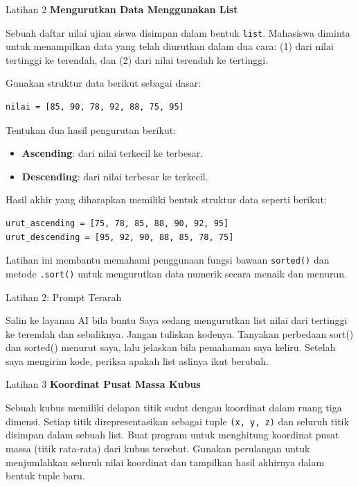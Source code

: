 \documentclass[aspectratio=169, table]{beamer}
\begin{document}
\begin{frame}[fragile,allowframebreaks=0.8]{Latihan 2}
\footnotesize
\textbf{Mengurutkan Data Menggunakan List}\par\medskip
Sebuah daftar nilai ujian siswa disimpan dalam bentuk \texttt{list}. 
Mahasiswa diminta untuk menampilkan data yang telah diurutkan dalam dua cara:  
(1) dari nilai tertinggi ke terendah, dan  
(2) dari nilai terendah ke tertinggi.

Gunakan struktur data berikut sebagai dasar:

\begin{lstlisting}[style=PythonStyle, breaklines=true]
nilai = [85, 90, 78, 92, 88, 75, 95]
\end{lstlisting}

Tentukan dua hasil pengurutan berikut:
\begin{itemize}
  \item \textbf{Ascending}: dari nilai terkecil ke terbesar.
  \item \textbf{Descending}: dari nilai terbesar ke terkecil.
\end{itemize}

Hasil akhir yang diharapkan memiliki bentuk struktur data seperti berikut:

\begin{lstlisting}[style=PythonStyle, breaklines=true]
urut_ascending = [75, 78, 85, 88, 90, 92, 95]
urut_descending = [95, 92, 90, 88, 85, 78, 75]
\end{lstlisting}

Latihan ini membantu memahami penggunaan fungsi bawaan \texttt{sorted()} 
dan metode \texttt{.sort()} untuk mengurutkan data numerik secara menaik dan menurun.
\end{frame}

\begin{frame}{Latihan 2: Prompt Terarah}
\begin{block}{Salin ke layanan AI bila buntu}
\small Saya sedang mengurutkan list nilai dari tertinggi ke terendah dan sebaliknya. Jangan tuliskan kodenya. Tanyakan perbedaan sort() dan sorted() menurut saya, lalu jelaskan bila pemahaman saya keliru. Setelah saya mengirim kode, periksa apakah list aslinya ikut berubah.
\end{block}
\end{frame}

\begin{frame}[fragile,allowframebreaks=0.8]{Latihan 3}
\footnotesize
\textbf{Koordinat Pusat Massa Kubus}\par\medskip
Sebuah kubus memiliki delapan titik sudut dengan koordinat dalam ruang tiga dimensi. 
  Setiap titik direpresentasikan sebagai tuple \texttt{(x, y, z)} dan seluruh titik disimpan dalam sebuah list.  
  Buat program untuk menghitung koordinat pusat massa (titik rata-rata) dari kubus tersebut.  
  Gunakan perulangan untuk menjumlahkan seluruh nilai koordinat dan tampilkan hasil akhirnya dalam bentuk tuple baru.
\end{frame}
\end{document}
